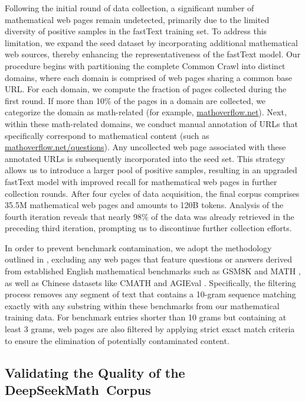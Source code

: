 \begin{itemize}[topsep=0pt]
Following the initial round of data collection, a significant number of mathematical web pages remain undetected, primarily due to the limited diversity of positive samples in the fastText training set. To address this limitation, we expand the seed dataset by incorporating additional mathematical web sources, thereby enhancing the representativeness of the fastText model. Our procedure begins with partitioning the complete Common Crawl into distinct domains, where each domain is comprised of web pages sharing a common base URL. For each domain, we compute the fraction of pages collected during the first round. If more than 10\% of the pages in a domain are collected, we categorize the domain as math-related (for example, \url{mathoverflow.net}).
Next, within these math-related domains, we conduct manual annotation of URLs that specifically correspond to mathematical content (such as \url{mathoverflow.net/questions}).
Any uncollected web page associated with these annotated URLs is subsequently incorporated into the seed set. This strategy allows us to introduce a larger pool of positive samples, resulting in an upgraded fastText model with improved recall for mathematical web pages in further collection rounds. After four cycles of data acquisition, the final corpus comprises 35.5M mathematical web pages and amounts to 120B tokens. Analysis of the fourth iteration reveals that nearly 98\% of the data was already retrieved in the preceding third iteration, prompting us to discontinue further collection efforts.

In order to prevent benchmark contamination, we adopt the methodology outlined in \cite{deepseek-coder}, excluding any web pages that feature questions or answers derived from established English mathematical benchmarks such as GSM8K \citep{gsm8k} and MATH \citep{MATH}, as well as Chinese datasets like CMATH \citep{wei2023cmath} and AGIEval \citep{agieval}. Specifically, the filtering process removes any segment of text that contains a 10-gram sequence matching exactly with any substring within these benchmarks from our mathematical training data. For benchmark entries shorter than 10 grams but containing at least 3 grams, web pages are also filtered by applying strict exact match criteria to ensure the elimination of potentially contaminated content.

\subsection{Validating the Quality of the DeepSeekMath~Corpus}


\end{itemize}
